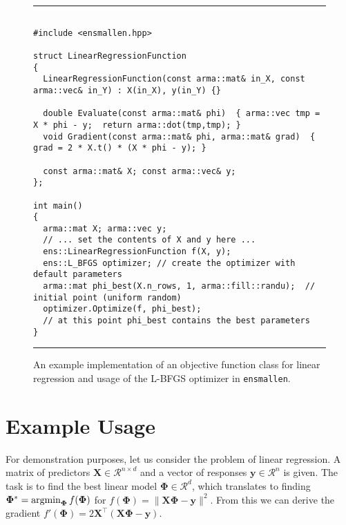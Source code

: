 \documentclass[twoside,11pt]{article}
\begin{document}
\begin{figure}[b!]
\hrule
\vspace{1ex}
\centering
\begin{verbatim}

#include <ensmallen.hpp>

struct LinearRegressionFunction
{
  LinearRegressionFunction(const arma::mat& in_X, const arma::vec& in_Y) : X(in_X), y(in_Y) {}

  double Evaluate(const arma::mat& phi)  { arma::vec tmp = X * phi - y;  return arma::dot(tmp,tmp); }
  void Gradient(const arma::mat& phi, arma::mat& grad)  { grad = 2 * X.t() * (X * phi - y); }

  const arma::mat& X; const arma::vec& y;
};

int main()
{
  arma::mat X; arma::vec y;
  // ... set the contents of X and y here ...
  ens::LinearRegressionFunction f(X, y);
  ens::L_BFGS optimizer; // create the optimizer with default parameters
  arma::mat phi_best(X.n_rows, 1, arma::fill::randu);  // initial point (uniform random)
  optimizer.Optimize(f, phi_best);
  // at this point phi_best contains the best parameters
}
\end{verbatim}
\hrule
\vspace*{-0.5em}
\caption{An example implementation of an objective function class for linear
regression and usage of the L-BFGS optimizer in {\tt ensmallen}.
}
\label{fig:lr_function}
\vspace*{-2em}
\end{figure}


\section{Example Usage}
\label{sec:linreg_example}

For demonstration purposes, let us consider the problem of linear regression.
A matrix of predictors $\bm X \in \mathcal{R}^{n \times d}$
and a vector of responses $\bm y \in \mathcal{R}^n$ is given.
The task is to find the best linear model $\bm \Phi \in \mathcal{R}^d$,
which translates to finding
$\bm \Phi^* = \operatornamewithlimits{argmin}_{\bm\Phi} f(\bm \Phi)$ for
$f(\bm \Phi) = \| \bm X \bm \Phi - \bm y \|^2.$
From this we can derive the gradient
$f'(\bm \Phi) = 2 \bm X^{\top} (\bm X \bm \Phi - \bm y).$
\end{document}
